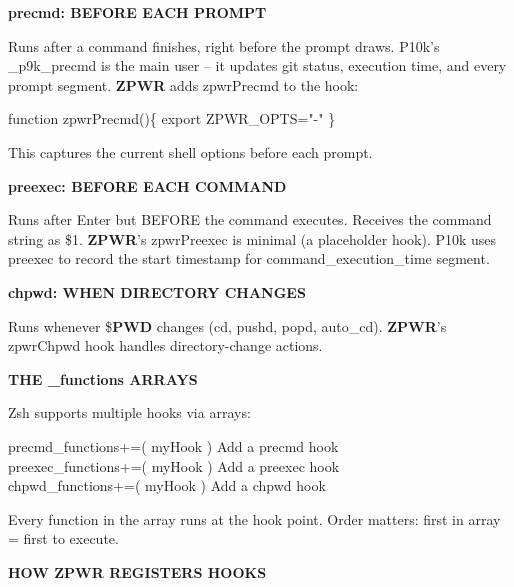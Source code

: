 \documentclass[11pt,a4paper,twoside]{book}
\begin{document}
\vspace{12pt}
{\bfseries\color{neonyellow} precmd: BEFORE EACH \textbf{PROMPT}}\vspace{4pt}

Runs after a command finishes, right before the prompt draws. P10k's \_p9k\_precmd is the main user -- it updates git status, execution time, and every prompt segment. \textbf{ZPWR} adds zpwrPrecmd to the hook:

\begin{codebox}
\color{neongreen}function zpwrPrecmd()\{ export ZPWR\_OPTS="-" \}\\
\end{codebox}

This captures the current shell options before each prompt.


\vspace{12pt}
{\bfseries\color{neonyellow} preexec: BEFORE EACH COMMAND}\vspace{4pt}

Runs after Enter but BEFORE the command executes. Receives the command string as \$1. \textbf{ZPWR}'s zpwrPreexec is minimal (a placeholder hook). P10k uses preexec to record the start timestamp for command\_execution\_time segment.


\vspace{12pt}
{\bfseries\color{neonyellow} chpwd: WHEN DIRECTORY CHANGES}\vspace{4pt}

Runs whenever \$\textbf{PWD} changes (cd, pushd, popd, auto\_cd). \textbf{ZPWR}'s zpwrChpwd hook handles directory-change actions.


\vspace{12pt}
{\bfseries\color{neonyellow} THE \_functions ARRAYS}\vspace{4pt}

Zsh supports multiple hooks via arrays:

\begin{codebox}
\color{neongreen}precmd\_functions+=( myHook )      Add a precmd hook\\
\color{neongreen}preexec\_functions+=( myHook )     Add a preexec hook\\
\color{neongreen}chpwd\_functions+=( myHook )       Add a chpwd hook\\
\end{codebox}

Every function in the array runs at the hook point. Order matters: first in array = first to execute.


\vspace{12pt}
{\bfseries\color{neonyellow} HOW \textbf{ZPWR} REGISTERS HOOKS}\vspace{4pt}
\end{document}
